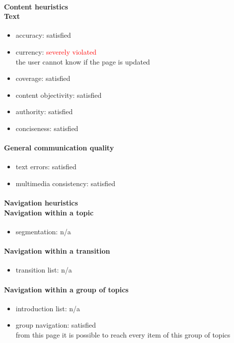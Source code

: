 \begin{enumerate}
	\paragraph*{Content heuristics \\ Text}
	\begin{itemize}
		\item accuracy: satisfied
		\item currency: \textcolor{red}{severely violated}\\the user cannot know if the page is updated
		\item coverage: satisfied
		\item content objectivity: satisfied
		\item authority: satisfied
		\item conciseness: satisfied		
	\end{itemize}
	
	\paragraph*{General communication quality}
	\begin{itemize}
		\item text errors: satisfied
		\item multimedia consistency: satisfied
	\end{itemize}
	
	\paragraph*{Navigation heuristics \\ Navigation within a topic}
	\begin{itemize}
		\item segmentation: n/a
	\end{itemize}	
	
	\paragraph*{Navigation within a transition}
	\begin{itemize}
		\item transition list: n/a
	\end{itemize}
	
	\paragraph*{Navigation within a group of topics}
	\begin{itemize}
		\item introduction list: n/a
		\item group navigation: satisfied\\
		from this page it is possible to reach every item of this group of topics
	\end{itemize}
	

\end{enumerate}
